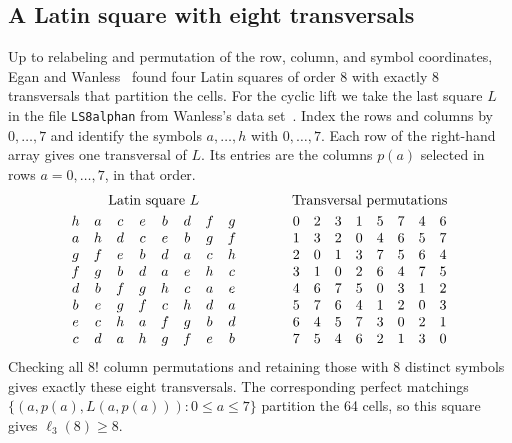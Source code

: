 \documentclass[10pt]{article}
\numberwithin{equation}{section}
\begin{document}
\subsection{A Latin square with eight transversals}\label{finite:subsec:latin}
Up to relabeling and permutation of the row, column, and symbol coordinates, Egan and Wanless~\cite{EganWanless2012} found four Latin squares of order 8 with exactly 8 transversals that partition the cells. For the cyclic lift we take the last square $L$ in the file \texttt{LS8alphan} from Wanless's data set~\cite{WanlessTransversalData}. Index the rows and columns by $0,\ldots,7$ and identify the symbols $a,\ldots,h$ with $0,\ldots,7$. Each row of the right-hand array gives one transversal of $L$. Its entries are the columns $p(a)$ selected in rows $a=0,\ldots,7$, in that order.
\[
\begin{array}{@{}c@{\qquad\qquad}c@{}}
 \text{Latin square }L & \text{Transversal permutations}\\[3pt]
 \begin{array}{@{}*{8}{c}@{}}
h&a&c&e&b&d&f&g\\
a&h&d&c&e&b&g&f\\
g&f&e&b&d&a&c&h\\
f&g&b&d&a&e&h&c\\
d&b&f&g&h&c&a&e\\
b&e&g&f&c&h&d&a\\
e&c&h&a&f&g&b&d\\
c&d&a&h&g&f&e&b
 \end{array}
 &
 \begin{array}{@{}*{8}{c}@{}}
0&2&3&1&5&7&4&6\\
1&3&2&0&4&6&5&7\\
2&0&1&3&7&5&6&4\\
3&1&0&2&6&4&7&5\\
4&6&7&5&0&3&1&2\\
5&7&6&4&1&2&0&3\\
6&4&5&7&3&0&2&1\\
7&5&4&6&2&1&3&0
 \end{array}
\end{array}
\]
Checking all $8!$ column permutations and retaining those with 8 distinct symbols gives exactly these eight transversals. The corresponding perfect matchings $\{(a,p(a),L(a,p(a)))\colon 0\le a\le7\}$ partition the 64 cells, so this square gives $\ell_3(8)\ge8$.
\end{document}
